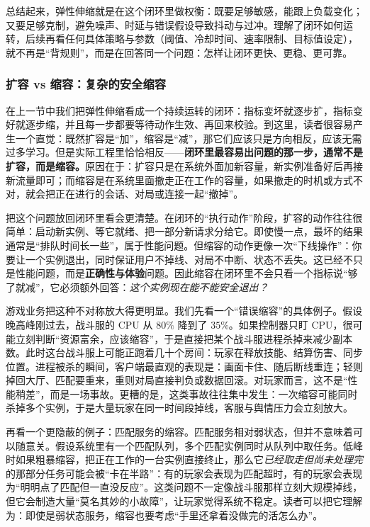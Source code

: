 总结起来，弹性伸缩就是在这个闭环里做权衡：既要足够敏感，能跟上负载变化；又要足够克制，避免噪声、时延与错误假设导致抖动与过冲。理解了闭环如何运转，后续再看任何具体策略与参数（阈值、冷却时间、速率限制、目标值设定），就不再是“背规则”，而是在回答同一个问题：怎样让闭环更快、更稳、更可靠。

\subsubsection{扩容 vs 缩容：复杂的安全缩容}
在上一节中我们把弹性伸缩看成一个持续运转的闭环：指标变坏就逐步扩，指标变好就逐步缩，并且每一步都要等待动作生效、再回来校验。到这里，读者很容易产生一个直觉：既然扩容是“加”，缩容是“减”，那它们应该只是方向相反，应该无需过多学习。但是实际工程里恰恰相反——\textbf{闭环里最容易出问题的那一步，通常不是扩容，而是缩容。}原因在于：扩容只是在系统外面加新容量，新实例准备好后再接新流量即可；而缩容是在系统里面撤走正在工作的容量，如果撤走的时机或方式不对，就会把正在进行的会话、对局或连接一起“撤掉”。

把这个问题放回闭环里看会更清楚。在闭环的“执行动作”阶段，扩容的动作往往很简单：启动新实例、等它就绪、把一部分新请求分给它。即使慢一点，最坏的结果通常是“排队时间长一些”，属于性能问题。但缩容的动作更像一次“下线操作”：你要让一个实例退出，同时保证用户不掉线、对局不中断、状态不丢失。这已经不只是性能问题，而是\textbf{正确性与体验}问题。因此缩容在闭环里不会只看一个指标说“够了就减”，它必须额外回答：\emph{这个实例现在能不能安全退出？}

游戏业务把这种不对称放大得更明显。我们先看一个“错误缩容”的具体例子。假设晚高峰刚过去，战斗服的 CPU 从 $80\%$ 降到了 $35\%$。如果控制器只盯 CPU，很可能立刻判断“资源富余，应该缩容”，于是直接把某个战斗服进程杀掉来减少副本数。此时这台战斗服上可能正跑着几十个房间：玩家在释放技能、结算伤害、同步位置。进程被杀的瞬间，客户端最直观的表现是：画面卡住、随后断线重连；轻则掉回大厅、匹配要重来，重则对局直接判负或数据回滚。对玩家而言，这不是“性能稍差”，而是一场事故。更糟的是，这类事故往往集中发生：一次缩容可能同时杀掉多个实例，于是大量玩家在同一时间段掉线，客服与舆情压力会立刻放大。

再看一个更隐蔽的例子：匹配服务的缩容。匹配服务相对弱状态，但并不意味着可以随意关。假设系统里有一个匹配队列，多个匹配实例同时从队列中取任务。低峰时如果粗暴缩容，把正在工作的一台实例直接终止，那么它\emph{已经取走但尚未处理完}的那部分任务可能会被“卡在半路”：有的玩家会表现为匹配超时，有的玩家会表现为“明明点了匹配但一直没反应”。这类问题不一定像战斗服那样立刻大规模掉线，但它会制造大量“莫名其妙的小故障”，让玩家觉得系统不稳定。读者可以把它理解为：即使是弱状态服务，缩容也要考虑“手里还拿着没做完的活怎么办”。

